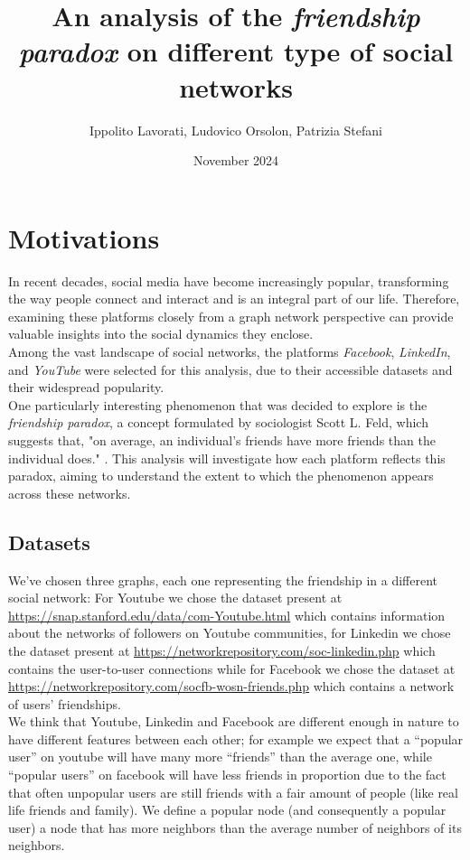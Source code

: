 \documentclass{article}
\title{An analysis of the \textit{friendship paradox} on different type of social networks}
\author{Ippolito Lavorati, Ludovico Orsolon, Patrizia Stefani}
\date{November 2024}
\begin{document}
\maketitle
\section{Motivations}
In recent decades, social media have become increasingly popular, transforming the way people connect and interact and is an integral part of our life. Therefore, examining these platforms closely from a graph network perspective can provide valuable insights into the social dynamics they enclose.\\
Among the vast landscape of social networks, the  platforms \textit{Facebook}, \textit{LinkedIn}, and \textit{YouTube} were selected for this analysis, due to their accessible datasets and their widespread popularity.\\
One particularly interesting phenomenon that was decided to explore is the \textit{friendship paradox}, a concept formulated by sociologist Scott L. Feld, which suggests that, "on average, an individual's friends have more friends than the individual does." \cite{friendship_paradox}.
This analysis will investigate how each platform reflects this paradox, aiming to understand the extent to which the phenomenon appears across these networks.

\subsection{Datasets}
We’ve chosen three graphs, each one representing the friendship in a different social network:
For Youtube we chose the dataset present at \url{https://snap.stanford.edu/data/com-Youtube.html} which contains information about the networks of followers on Youtube communities, for Linkedin we chose the dataset present at \url{https://networkrepository.com/soc-linkedin.php} which contains the user-to-user connections while for Facebook we chose the dataset at \url{https://networkrepository.com/socfb-wosn-friends.php} which contains a network of users' friendships.\\
We think that Youtube, Linkedin and Facebook are different enough in nature to have different features between each other; for example we expect that a “popular user” on youtube will have many more “friends” than the average one, while “popular users” on facebook will have less friends in proportion due to the fact that often unpopular users are still friends with a fair amount of people (like real life friends and family). We define a popular node (and consequently a popular user) a node that has more neighbors than the average number of neighbors of its neighbors.
\end{document}
